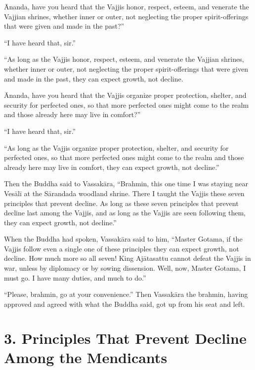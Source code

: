 \documentclass[12pt,openany]{book}%
\begin{document}
Ānanda, have you heard that the Vajjis honor, respect, esteem, and venerate the Vajjian shrines, whether inner or outer, not neglecting the proper spirit-offerings that were given and made in the past?” 

“I have heard that, sir.” 

“As long as the Vajjis honor, respect, esteem, and venerate the Vajjian shrines, whether inner or outer, not neglecting the proper spirit-offerings that were given and made in the past, they can expect growth, not decline. 

Ānanda, have you heard that the Vajjis organize proper protection, shelter, and security for perfected ones, so that more perfected ones might come to the realm and those already here may live in comfort?” 

“I have heard that, sir.” 

“As long as the Vajjis organize proper protection, shelter, and security for perfected ones, so that more perfected ones might come to the realm and those already here may live in comfort, they can expect growth, not decline.” 

Then the Buddha said to \textsanskrit{Vassakāra}, “Brahmin, this one time I was staying near \textsanskrit{Vesālī} at the \textsanskrit{Sārandada} woodland shrine. There I taught the Vajjis these seven principles that prevent decline. As long as these seven principles that prevent decline last among the Vajjis, and as long as the Vajjis are seen following them, they can expect growth, not decline.” 

When the Buddha had spoken, \textsanskrit{Vassakāra} said to him, “Master Gotama, if the Vajjis follow even a single one of these principles they can expect growth, not decline. How much more so all seven! King \textsanskrit{Ajātasattu} cannot defeat the Vajjis in war, unless by diplomacy or by sowing dissension. Well, now, Master Gotama, I must go. I have many duties, and much to do.” 

“Please, brahmin, go at your convenience.” Then \textsanskrit{Vassakāra} the brahmin, having approved and agreed with what the Buddha said, got up from his seat and left. 

\section*{3. Principles That Prevent Decline Among the Mendicants }
\end{document}
